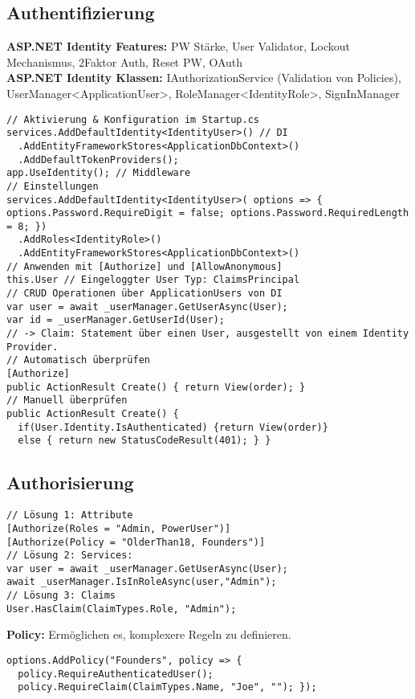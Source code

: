 \subsection{Authentifizierung}
\textcolor{b}{\textbf{ASP.NET Identity Features:}} PW Stärke, User Validator, Lockout Mechanismus, 2Faktor Auth, Reset PW, OAuth\\
\textcolor{b}{\textbf{ASP.NET Identity Klassen:}} IAuthorizationService (Validation von Policies), UserManager<ApplicationUser>, RoleManager<IdentityRole>, SignInManager
\begin{lstlisting}[style=csh]
// Aktivierung & Konfiguration im Startup.cs
services.AddDefaultIdentity<IdentityUser>() // DI
  .AddEntityFrameworkStores<ApplicationDbContext>()
  .AddDefaultTokenProviders();
app.UseIdentity(); // Middleware
// Einstellungen
services.AddDefaultIdentity<IdentityUser>( options => { options.Password.RequireDigit = false; options.Password.RequiredLength = 8; })
  .AddRoles<IdentityRole>()
  .AddEntityFrameworkStores<ApplicationDbContext>()
// Anwenden mit [Authorize] und [AllowAnonymous]
this.User // Eingeloggter User Typ: ClaimsPrincipal
// CRUD Operationen über ApplicationUsers von DI
var user = await _userManager.GetUserAsync(User);
var id = _userManager.GetUserId(User);
// -> Claim: Statement über einen User, ausgestellt von einem Identity Provider.
// Automatisch überprüfen
[Authorize]
public ActionResult Create() { return View(order); }
// Manuell überprüfen
public ActionResult Create() {
  if(User.Identity.IsAuthenticated) {return View(order)}
  else { return new StatusCodeResult(401); } }
\end{lstlisting}
\subsection{Authorisierung}
\begin{lstlisting}[style=csh]
// Lösung 1: Attribute
[Authorize(Roles = "Admin, PowerUser")]
[Authorize(Policy = "OlderThan18, Founders")]
// Lösung 2: Services:
var user = await _userManager.GetUserAsync(User);
await _userManager.IsInRoleAsync(user,"Admin");
// Lösung 3: Claims
User.HasClaim(ClaimTypes.Role, "Admin");
\end{lstlisting}
\textcolor{b}{\textbf{Policy:}} Ermöglichen es, komplexere Regeln zu definieren.
\begin{lstlisting}[style=csh]
options.AddPolicy("Founders", policy => {
  policy.RequireAuthenticatedUser();
  policy.RequireClaim(ClaimTypes.Name, "Joe", ""); });
\end{lstlisting}
